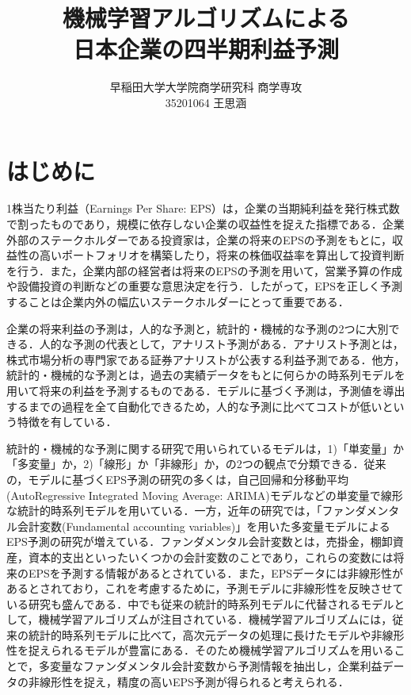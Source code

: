 \documentclass[a4paper，12pt]{jsarticle}
\title{機械学習アルゴリズムによる\\
  日本企業の四半期利益予測}
\author{早稲田大学大学院商学研究科 商学専攻\\
  35201064 王思涵}
\begin{document}
\maketitle
\tableofcontents

\part{はじめに}

1株当たり利益（Earnings Per Share: EPS）は，企業の当期純利益を発行株式数で割ったものであり，規模に依存しない企業の収益性を捉えた指標である．企業外部のステークホルダーである投資家は，企業の将来のEPSの予測をもとに，収益性の高いポートフォリオを構築したり，将来の株価収益率を算出して投資判断を行う．また，企業内部の経営者は将来のEPSの予測を用いて，営業予算の作成や設備投資の判断などの重要な意思決定を行う．したがって，EPSを正しく予測することは企業内外の幅広いステークホルダーにとって重要である．

企業の将来利益の予測は，人的な予測と，統計的・機械的な予測の2つに大別できる．人的な予測の代表として，アナリスト予測がある．アナリスト予測とは，株式市場分析の専門家である証券アナリストが公表する利益予測である．他方，統計的・機械的な予測とは，過去の実績データをもとに何らかの時系列モデルを用いて将来の利益を予測するものである．モデルに基づく予測は，予測値を導出するまでの過程を全て自動化できるため，人的な予測に比べてコストが低いという特徴を有している\citep{sakurai1990}．

統計的・機械的な予測に関する研究で用いられているモデルは，1)「単変量」か「多変量」か，2)「線形」か「非線形」か，の2つの観点で分類できる\citep{zhang2004neural}．従来の，モデルに基づくEPS予測の研究の多くは，自己回帰和分移動平均(AutoRegressive Integrated Moving Average: ARIMA)モデル\citep*{box2015time}などの単変量で線形な統計的時系列モデルを用いている．一方，近年の研究では，「ファンダメンタル会計変数(Fundamental accounting variables)」を用いた多変量モデルによるEPS予測の研究が増えている．ファンダメンタル会計変数とは，売掛金，棚卸資産，資本的支出といったいくつかの会計変数のことであり，これらの変数には将来のEPSを予測する情報があるとされている\citep*{lev1993fundamental, abarbanell1997fundamental}．また，EPSデータには非線形性があるとされており\citep*{hopwood1986univariate}，これを考慮するために，予測モデルに非線形性を反映させている研究も盛んである．中でも従来の統計的時系列モデルに代替されるモデルとして，機械学習アルゴリズムが注目されている．機械学習アルゴリズムには，従来の統計的時系列モデルに比べて，高次元データの処理に長けたモデルや非線形性を捉えられるモデルが豊富にある\citep*{cao2020fundamental}．そのため機械学習アルゴリズムを用いることで，多変量なファンダメンタル会計変数から予測情報を抽出し，企業利益データの非線形性を捉え，精度の高いEPS予測が得られると考えられる．
\end{document}
